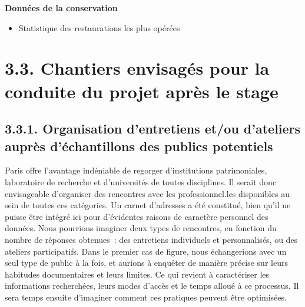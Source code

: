 \documentclass[a4paper,12pt, twoside]{book}
\begin{document}
\large \textbf{\textcolor{teal2}{Données de la conservation}}\\

\normalsize
\begin{itemize}
    \item Statistique des restaurations les plus opérées
\end{itemize}

\vfill

\section*{3.3. Chantiers envisagés pour la conduite du projet après le stage}

\subsection*{3.3.1. Organisation d’entretiens et/ou d’ateliers auprès d’échantillons des publics potentiels}

Paris offre l’avantage indéniable de regorger d’institutions patrimoniales, laboratoire de recherche et d’universités de toutes disciplines. Il serait donc envisageable d’organiser des rencontres avec les professionnel.les disponibles au sein de toutes ces catégories. Un carnet d’adresses a été constitué, bien qu’il ne puisse être intégré ici pour d’évidentes raisons de caractère personnel des données. Nous pourrions imaginer deux types de rencontres, en fonction du nombre de réponses obtenues~: des entretiens individuels et personnalisés, ou des ateliers participatifs. Dans le premier cas de figure, nous échangerions avec un seul type de public à la fois, et aurions à enquêter de manière précise sur leurs habitudes documentaires et leurs limites. Ce qui revient à caractériser les informations recherchées, leurs modes d’accès et le temps alloué à ce processus. Il sera temps ensuite d’imaginer comment ces pratiques peuvent être optimisées.
\end{document}
